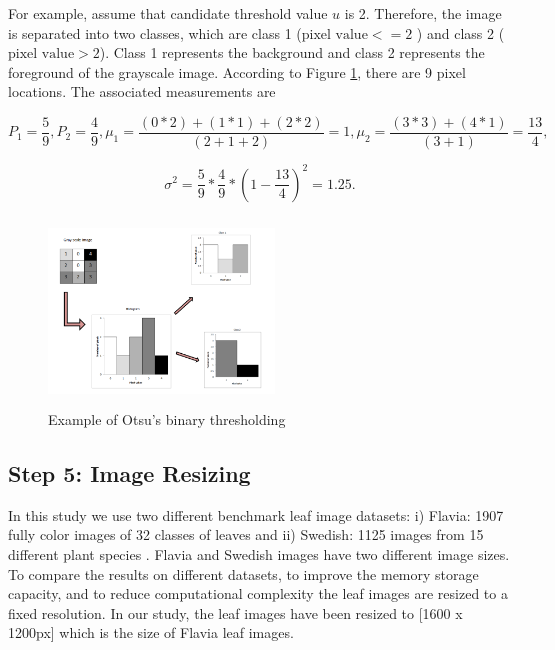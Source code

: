 \documentclass{article}
\begin{document}
For example, assume that candidate threshold value \(u\) is 2.
Therefore, the image is separated into two classes, which are class 1
(\(\text{pixel value} <= 2\) ) and class 2 (\(\text{pixel value} > 2\)).
Class 1 represents the background and class 2 represents the foreground
of the grayscale image. According to Figure \ref{fig:otsu}, there are 9
pixel locations. The associated measurements are

\[P_1 = \frac{5}{9}, P_2 = \frac{4}{9}, \mu_1 = \frac{(0*2) +(1*1) + (2*2)}{(2+1+2)} = 1, \mu_2 = \frac{(3*3) +(4*1)}{(3+1)} = \frac{13}{4},\]

\[\sigma^2 = \frac{5}{9} * \frac{4}{9} * (1-\frac{13}{4})^2 = 1.25.\]

\begin{figure}[!ht]

\centering
       \includegraphics[width=60mm, height=50mm]{Figures/otsu.png}
        
        

\caption{Example of Otsu's binary thresholding}
\label{fig:otsu}
        \end{figure}

\hypertarget{step-5-image-resizing}{%
\subsection{Step 5: Image Resizing}\label{step-5-image-resizing}}

In this study we use two different benchmark leaf image datasets:
i) Flavia: 1907 fully color images of 32 classes of leaves \citep{wu2007leaf} and ii) Swedish: 1125 images from 15 different plant species
\citep{soderkvist2001computer}. Flavia and Swedish images have two different image sizes. To compare the results on different datasets, to improve the
memory storage capacity, and to reduce computational complexity the leaf
images are resized to a fixed resolution. In our study, the leaf images
have been resized to {[}1600 x 1200px{]} which is the size of Flavia
leaf images.
\end{document}
